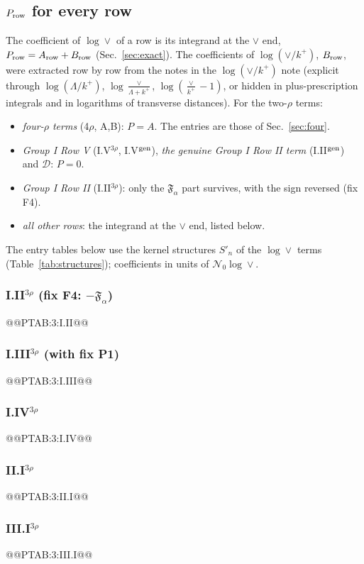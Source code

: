 \documentclass[10pt]{article}
\numberwithin{equation}{section}
\newcommand{\NO}{\mathcal N_0}
\begin{document}
\subsection{\texorpdfstring{$P_{\rm row}$}{P} for every row}\label{sec:Prows}
The coefficient of $\log\vee$ of a row is its integrand at the $\vee$ end, $P_{\rm row}=A_{\rm row}+B_{\rm row}$ (Sec.~\ref{sec:exact}). The coefficients of $\log(\vee/k^+)$, $B_{\rm row}$, were extracted row by row from the notes in the $\log(\vee/k^+)$ note (explicit through $\log(\Lambda/k^+)$, $\log\frac{\vee}{\Lambda+k^+}$, $\log(\frac\vee{k^+}-1)$, or hidden in plus-prescription integrals and in logarithms of transverse distances). For the two-$\rho$ terms:
\begin{itemize}
\item \emph{four-$\rho$ terms} (4$\rho$, A,B): $P=A$. The entries are those of Sec.~\ref{sec:four}.
\item \emph{Group I Row V} (I.V$^{3\rho}$, I.V$^{\rm gen}$), \emph{the genuine Group I Row II term} (I.II$^{\rm gen}$) and $\mathcal D$: $P=0$.
\item \emph{Group I Row II} (I.II$^{3\rho}$): only the $\mathfrak F_\alpha$ part survives, with the sign reversed (fix F4).
\item \emph{all other rows}: the integrand at the $\vee$ end, listed below.
\end{itemize}
The entry tables below use the kernel structures $S'_n$ of the $\log\vee$ terms (Table~\ref{tab:structures}); coefficients in units of $\NO\log\vee$.

\subsubsection*{I.II$^{3\rho}$ (fix F4: $-\mathfrak F_\alpha$)}
@@PTAB:3:I.II@@
\subsubsection*{I.III$^{3\rho}$ (with fix P1)}
@@PTAB:3:I.III@@
\subsubsection*{I.IV$^{3\rho}$}
@@PTAB:3:I.IV@@
\subsubsection*{II.I$^{3\rho}$}
@@PTAB:3:II.I@@
\subsubsection*{III.I$^{3\rho}$}
@@PTAB:3:III.I@@
\end{document}
